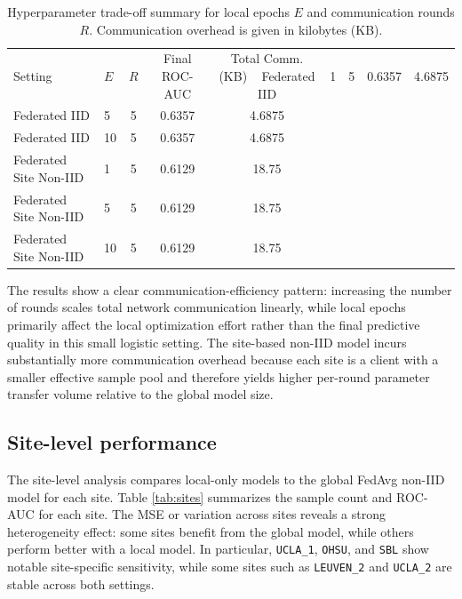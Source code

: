 \documentclass[sigconf]{acmart}
\begin{document}
\begin{table}[t]
\centering
\caption{Hyperparameter trade-off summary for local epochs $E$ and communication rounds $R$. Communication overhead is given in kilobytes (KB).}
\label{tab:hyperparams}
\begin{tabular}{llccc}
\toprule
Setting & $E$ & $R$ & Final ROC-AUC & Total Comm. (KB) \
\midrule
Federated IID & 1 & 5 & 0.6357 & 4.6875 \\
Federated IID & 5 & 5 & 0.6357 & 4.6875 \\
Federated IID & 10 & 5 & 0.6357 & 4.6875 \\
Federated Site Non-IID & 1 & 5 & 0.6129 & 18.75 \\
Federated Site Non-IID & 5 & 5 & 0.6129 & 18.75 \\
Federated Site Non-IID & 10 & 5 & 0.6129 & 18.75 \\
\bottomrule
\end{tabular}
\end{table}

The results show a clear communication-efficiency pattern: increasing the number of rounds scales total network communication linearly, while local epochs primarily affect the local optimization effort rather than the final predictive quality in this small logistic setting. The site-based non-IID model incurs substantially more communication overhead because each site is a client with a smaller effective sample pool and therefore yields higher per-round parameter transfer volume relative to the global model size.

\subsection{Site-level performance}
The site-level analysis compares local-only models to the global FedAvg non-IID model for each site. Table \ref{tab:sites} summarizes the sample count and ROC-AUC for each site. The MSE or variation across sites reveals a strong heterogeneity effect: some sites benefit from the global model, while others perform better with a local model. In particular, \texttt{UCLA\_1}, \texttt{OHSU}, and \texttt{SBL} show notable site-specific sensitivity, while some sites such as \texttt{LEUVEN\_2} and \texttt{UCLA\_2} are stable across both settings.
\end{document}

